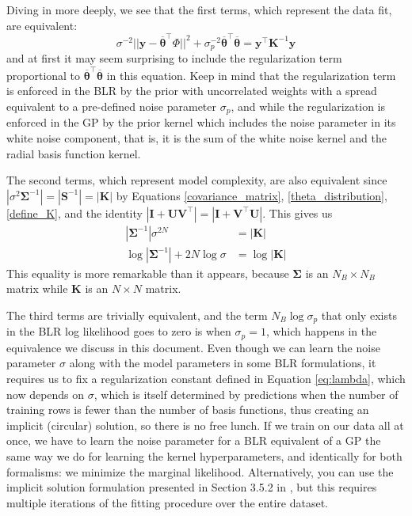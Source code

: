 \documentclass{article}
\begin{document}
Diving in more deeply, we see that the first terms, which represent the data fit, are equivalent:
\begin{equation}
    \sigma^{-2}||\mathbf{y}-\overline{\boldsymbol{\theta}} ^\top \Phi ||^2 +\sigma_p^{-2} \overline{\boldsymbol{\theta}}^\top\overline{\boldsymbol{\theta}} = \mathbf{y}^\top \mathbf{K}^{-1} \mathbf{y} 
\end{equation}and at first it may seem surprising to include the regularization term proportional to $\overline{\boldsymbol{\theta}}^\top\overline{\boldsymbol{\theta}}$ in this equation. Keep in mind that the regularization term is enforced in the BLR by the prior with uncorrelated weights with a spread equivalent to a pre-defined noise parameter $\sigma_p$, and while the regularization is enforced in the GP by the prior kernel which includes the noise parameter in its white noise component, that is, it is the sum of the white noise kernel and the radial basis function kernel. 

The second terms, which represent model complexity, are also equivalent since $|\sigma^2\boldsymbol{\Sigma}^{-1}|=|\mathbf{S}^{-1}|=|\mathbf{K}|$ by Equations \ref{covariance_matrix}, \ref{theta_distribution}, \ref{define_K}, and the identity $|\mathbf{I}+\mathbf{UV}^\top|=|\mathbf{I}+\mathbf{V}^\top\mathbf{U}|$. This gives us
\begin{equation}
\begin{split}|\boldsymbol{\Sigma}^{-1}|\sigma^{2N}&=|\mathbf{K}|\\\log|\boldsymbol{\Sigma}^{-1}|+2N\log \sigma&=\log|\mathbf{K}|\end{split}\end{equation}This equality is more remarkable than it appears, because $\boldsymbol{\Sigma}$ is an $N_B\times N_B$ matrix while $\mathbf{K}$ is an $N\times N$ matrix. 

The third terms are trivially equivalent, and the term $N_B\log \sigma_p$ that only exists in the BLR log likelihood goes to zero is when $\sigma_p=1$, which happens in the equivalence we discuss in this document. Even though we can learn the noise parameter $\sigma$ along with the model parameters in some BLR formulations\cite{KoyoteScience}, it requires us to fix a regularization constant defined in Equation \ref{eq:lambda}, which now depends on $\sigma$, which is itself determined by predictions when the number of training rows is fewer than the number of basis functions, thus creating an implicit (circular) solution, so there is no free lunch. If we train on our data all at once, we have to learn the noise parameter for a BLR equivalent of a GP the same way we do for learning the kernel hyperparameters, and identically for both formalisms: we minimize the marginal likelihood. Alternatively, you can use the implicit solution formulation presented in Section 3.5.2 in \cite{bishop}, but this requires multiple iterations of the fitting procedure over the entire dataset.
\end{document}
